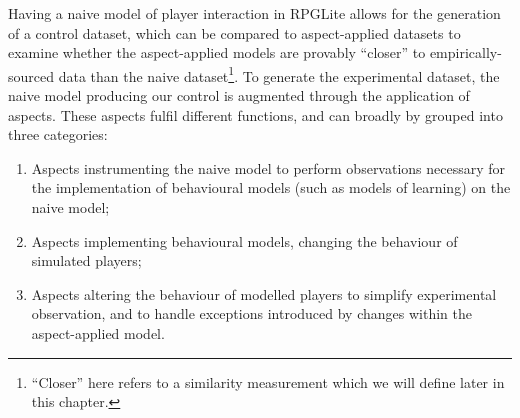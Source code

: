 



Having a naive model of player interaction in RPGLite allows for the generation
of a control dataset, which can be compared to aspect-applied datasets to
examine whether the aspect-applied models are provably ``closer'' to
empirically-sourced data than the naive dataset\footnote{``Closer'' here refers
to a similarity measurement which we will define later in this chapter.}. To
generate the experimental dataset, the naive model producing our control is
augmented through the application of aspects. These aspects fulfil different
functions, and can broadly by grouped into three categories:

\begin{enumerate}
  \item Aspects instrumenting the naive model to perform observations necessary
  for the implementation of behavioural models (such as models of learning) on
  the naive model;
  \item Aspects implementing behavioural models, changing the behaviour of
  simulated players;
  \item Aspects altering the behaviour of modelled players to simplify
  experimental observation, and to handle exceptions introduced by changes
  within the aspect-applied model.
\end{enumerate}

